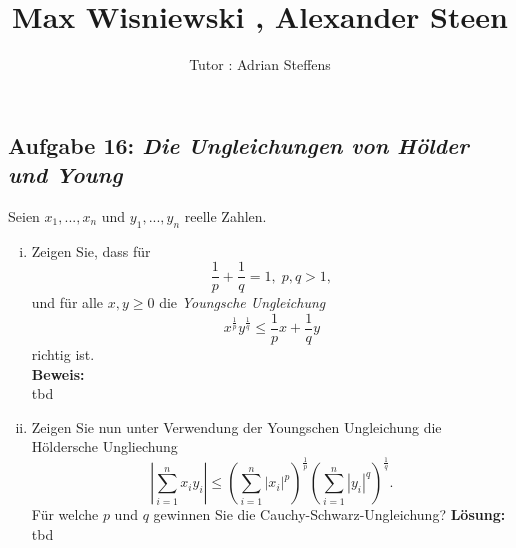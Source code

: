 \documentclass[11pt,a4paper,ngerman]{article}
\date{}
\title{Max Wisniewski , Alexander Steen}
\author{Tutor : Adrian Steffens}
\begin{document}

\maketitle
\thispagestyle{fancy}

\subsection*{Aufgabe 16: \mdseries\itshape Die Ungleichungen von Hölder und Young}
Seien $x_1,...,x_n$ und $y_1,...,y_n$ reelle Zahlen.

\begin{enumerate}[(i)]
	\item Zeigen Sie, dass für
		$$
			\frac{1}{p} + \frac{1}{q} = 1, \; p,q>1,
		$$
		und für alle $x,y\geq 0$ die \emph{Youngsche Ungleichung}
		$$
			x^{\frac{1}{p}} y^{\frac{1}{q}} \leq \frac{1}{p} x + \frac{1}{q} y
		$$
		richtig ist.\\
	\textbf{Beweis:}\\
		tbd

	\item Zeigen Sie nun unter Verwendung der Youngschen Ungleichung die Höldersche Ungliechung
		$$
			\left| \overset{n}{\underset{i=1}{\sum}} x_i y_i \right| \leq \left( \overset{n}{\underset{i=1}{\sum}} |x_i|^p \right)^{\frac{1}{p}}
				\left( \overset{n}{\underset{i=1}{\sum}} | y_i |^q \right) ^{\frac{1}{q}}.
		$$
		Für welche $p$ und $q$ gewinnen Sie die Cauchy-Schwarz-Ungleichung?
	\textbf{Lösung:}\\
		tbd
\end{enumerate}
\end{document}
